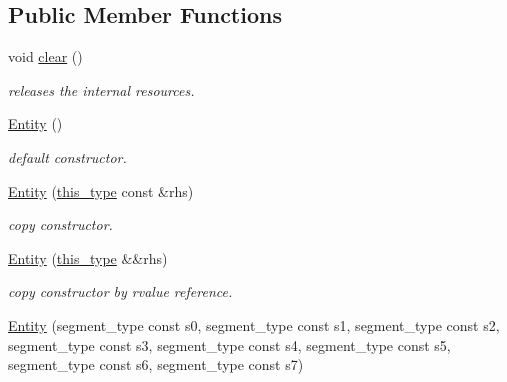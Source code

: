 \subsection*{Public Member Functions}
\begin{DoxyCompactItemize}
\item 
\hypertarget{classhryky_1_1ip_1_1v6_1_1_entity_ae81038827e1e63b0d3a70b598994277b}{void \hyperlink{classhryky_1_1ip_1_1v6_1_1_entity_ae81038827e1e63b0d3a70b598994277b}{clear} ()}\label{classhryky_1_1ip_1_1v6_1_1_entity_ae81038827e1e63b0d3a70b598994277b}

\begin{DoxyCompactList}\small\item\em releases the internal resources. \end{DoxyCompactList}\item 
\hyperlink{classhryky_1_1ip_1_1v6_1_1_entity_a1abd7d2eca9ec59fc53f8e35240d0bd0}{Entity} ()
\begin{DoxyCompactList}\small\item\em default constructor. \end{DoxyCompactList}\item 
\hypertarget{classhryky_1_1ip_1_1v6_1_1_entity_a3e4f124263d220cdfb8b9698179b83ce}{\hyperlink{classhryky_1_1ip_1_1v6_1_1_entity_a3e4f124263d220cdfb8b9698179b83ce}{Entity} (\hyperlink{classhryky_1_1ip_1_1v6_1_1_entity_a2d767b52e28cf8fea606e918d13bfbd7}{this\-\_\-type} const \&rhs)}\label{classhryky_1_1ip_1_1v6_1_1_entity_a3e4f124263d220cdfb8b9698179b83ce}

\begin{DoxyCompactList}\small\item\em copy constructor. \end{DoxyCompactList}\item 
\hypertarget{classhryky_1_1ip_1_1v6_1_1_entity_ad643c9b60b30f1c433378434e7a6fe4a}{\hyperlink{classhryky_1_1ip_1_1v6_1_1_entity_ad643c9b60b30f1c433378434e7a6fe4a}{Entity} (\hyperlink{classhryky_1_1ip_1_1v6_1_1_entity_a2d767b52e28cf8fea606e918d13bfbd7}{this\-\_\-type} \&\&rhs)}\label{classhryky_1_1ip_1_1v6_1_1_entity_ad643c9b60b30f1c433378434e7a6fe4a}

\begin{DoxyCompactList}\small\item\em copy constructor by rvalue reference. \end{DoxyCompactList}\item 
\hypertarget{classhryky_1_1ip_1_1v6_1_1_entity_aa25b392e69f49a53bdeb41de3bb1f043}{\hyperlink{classhryky_1_1ip_1_1v6_1_1_entity_aa25b392e69f49a53bdeb41de3bb1f043}{Entity} (segment\-\_\-type const s0, segment\-\_\-type const s1, segment\-\_\-type const s2, segment\-\_\-type const s3, segment\-\_\-type const s4, segment\-\_\-type const s5, segment\-\_\-type const s6, segment\-\_\-type const s7)}\label{classhryky_1_1ip_1_1v6_1_1_entity_aa25b392e69f49a53bdeb41de3bb1f043}


\end{DoxyCompactItemize}
